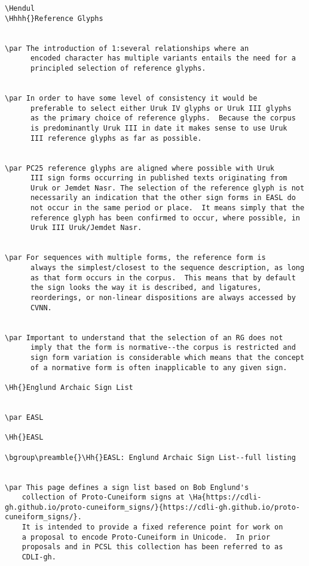 \begin{verbatim}
\Hendul
\Hhhh{}Reference Glyphs


\par The introduction of 1:several relationships where an
      encoded character has multiple variants entails the need for a
      principled selection of reference glyphs.


\par In order to have some level of consistency it would be
      preferable to select either Uruk IV glyphs or Uruk III glyphs
      as the primary choice of reference glyphs.  Because the corpus
      is predominantly Uruk III in date it makes sense to use Uruk
      III reference glyphs as far as possible.


\par PC25 reference glyphs are aligned where possible with Uruk
      III sign forms occurring in published texts originating from
      Uruk or Jemdet Nasr. The selection of the reference glyph is not
      necessarily an indication that the other sign forms in EASL do
      not occur in the same period or place.  It means simply that the
      reference glyph has been confirmed to occur, where possible, in
      Uruk III Uruk/Jemdet Nasr.


\par For sequences with multiple forms, the reference form is
      always the simplest/closest to the sequence description, as long
      as that form occurs in the corpus.  This means that by default
      the sign looks the way it is described, and ligatures,
      reorderings, or non-linear dispositions are always accessed by
      CVNN.


\par Important to understand that the selection of an RG does not
      imply that the form is normative--the corpus is restricted and
      sign form variation is considerable which means that the concept
      of a normative form is often inapplicable to any given sign.

\Hh{}Englund Archaic Sign List


\par EASL

\Hh{}EASL

\bgroup\preamble{}\Hh{}EASL: Englund Archaic Sign List--full listing


\par This page defines a sign list based on Bob Englund's
	collection of Proto-Cuneiform signs at \Ha{https://cdli-gh.github.io/proto-cuneiform_signs/}{https://cdli-gh.github.io/proto-cuneiform_signs/}.
	It is intended to provide a fixed reference point for work on
	a proposal to encode Proto-Cuneiform in Unicode.  In prior
	proposals and in PCSL this collection has been referred to as
	CDLI-gh.


\end{verbatim}
